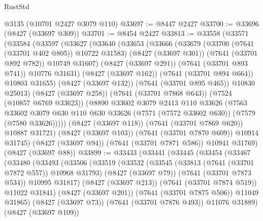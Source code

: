\begin{lexlean}{RustStd}
\begin{coremodule}
    @3135
    (@10701 @2427 @3079 @110)
@33697 := @8447 @2427
@33700 := @33696 (@8427 (@33697 @309))
@33701 := @8454 @2427
@33813 := @33558
    (@33571
      (@33584
        (@33597
          (@33627
            (@33640
              (@33653
                (@33666
                  (@33679
                    (@33700 (@7641 (@33701 @402 @805)) @10722 @31583)
                    (@8427 (@33697 @301))
                    (@7641 (@33701 @892 @782))
                    @10749
                    @31607)
                  (@8427 (@33697 @291))
                  (@7641 (@33701 @893 @741))
                  @10776
                  @31631)
                (@8427 (@33697 @162))
                (@7641 (@33701 @894 @664))
                @10803
                @31655)
              (@8427 (@33697 @132))
              (@7641 (@33701 @895 @465))
              @10830
              @25013)
            (@8427 (@33697 @258))
            (@7641 (@33701 @7868 @643))
            (@7524 (@10857 @6769 @33623))
            (@8890
              @33602
              @3079
              @2413
              @110
              @33626
              (@7563
                @33602
                @3079
                @630
                @110
                @630
                @33626
                (@7571 (@7572 @33602 @630))
                (@7579 (@7580 @33626)))))
          (@8427 (@33697 @118))
          (@7641 (@33701 @7869 @620))
          @10887
          @31721)
        (@8427 (@33697 @103))
        (@7641 (@33701 @7870 @609))
        @10914
        @31745)
      (@8427 (@33697 @94))
      (@7641 (@33701 @7871 @586))
      @10941
      @31769)
    (@8427 (@33697 @88))
@33899 := @33433
    (@33441
      (@33445
        (@33454
          (@33467
            (@33480
              (@33493
                (@33506
                  (@33519
                    (@33532
                      (@33545
                        (@33813 (@7641 (@33701 @7872 @557)) @10968 @31793)
                        (@8427 (@33697 @79))
                        (@7641 (@33701 @7873 @534))
                        @10995
                        @31817)
                      (@8427 (@33697 @213))
                      (@7641 (@33701 @7874 @519))
                      @11022
                      @31841)
                    (@8427 (@33697 @201))
                    (@7641 (@33701 @7875 @506))
                    @11049
                    @31865)
                  (@8427 (@33697 @73))
                  (@7641 (@33701 @7876 @493))
                  @11076
                  @31889)
                (@8427 (@33697 @109))

\end{coremodule}
\end{lexlean}
